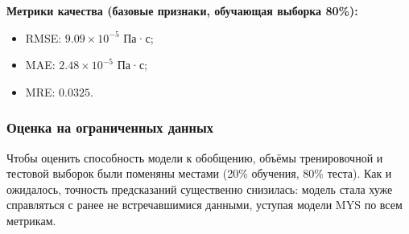 \documentclass[a4paper,12pt]{article}
\begin{document}
      \begin{minipage}{\textwidth}
        \textbf{Метрики качества (базовые признаки, обучающая выборка 80\%):}
        \begin{itemize}
          \item RMSE: \( 9.09 \times 10^{-5} \) Па·с;
          \item MAE: \( 2.48 \times 10^{-5} \) Па·с;
          \item MRE: \( 0.0325 \).
        \end{itemize}
      \end{minipage}

    \subsubsection{Оценка на ограниченных данных}

      Чтобы оценить способность модели к обобщению, объёмы тренировочной и тестовой выборок были поменяны местами (20\% обучения, 80\% теста). Как и ожидалось, точность предсказаний существенно снизилась: модель стала хуже справляться с ранее не встречавшимися данными, уступая модели MYS по всем метрикам.
      
\end{document}

